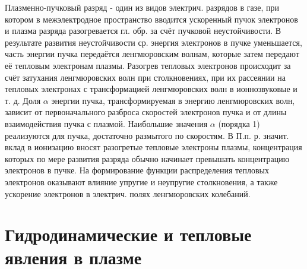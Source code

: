 \documentclass[10pt, a4paper]{article}
\numberwithin{equation}{section}
\begin{document}
Плазменно-пучковый разряд - один из видов электрич. разрядов в газе, при котором в межэлектродное пространство вводится ускоренный пучок электронов и плазма разряда разогревается гл. обр. за счёт пучковой неустойчивости. В результате развития неустойчивости ср. энергия электронов в пучке уменьшается, часть энергии пучка передаётся ленгмюровским волнам, которые затем передают её тепловым электронам плазмы. Разогрев тепловых электронов происходит за счёт затухания ленгмюровских волн при столкновениях, при их рассеянии на тепловых электронах с трансформацией ленгмюровских волн в ионнозвуковые и т. д.
Доля $\alpha$ энергии пучка, трансформируемая в энергию ленгмюровских волн, зависит от первоначального разброса скоростей электронов пуч­ка и от длины взаимодействия пучка с плазмой. Наибольшие значения $\alpha$  (порядка 1) реализуются для пучка, достаточно размытого по скоростям.
В П.п. р. значит. вклад в ионизацию вносят разогретые тепловые электроны плазмы, концентрация которых по мере развития разряда обычно начинает превышать концентрацию электронов в пучке. На формирование функции распределения тепловых электронов оказывают влияние упругие и неупругие столкновения, а так­же ускорение электронов в электрич. полях ленгмюровских колебаний.


\section{ Гидродинамические и тепловые явления в плазме}
\label{13}
\end{document}
